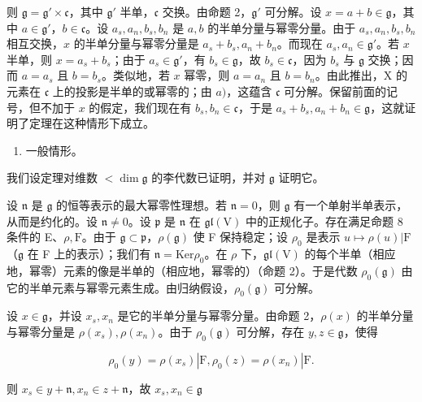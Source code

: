 则 \(\mathfrak{g} = \mathfrak{g}' \times \mathfrak{c}\)，其中 \(\mathfrak{g}'\) 半单，\(\mathfrak{c}\) 交换。由命题 2，\(\mathfrak{g}'\) 可分解。设 \(x = a + b \in \mathfrak{g}\)，其中 \(a \in \mathfrak{g}'\)，\(b \in \mathfrak{c}\)。设 \(a_s, a_n, b_s, b_n\) 是 \(a, b\) 的半单分量与幂零分量。由于 \(a_s, a_n, b_s, b_n\) 相互交换，\(x\) 的半单分量与幂零分量是 \(a_s + b_s, a_n + b_n\)。而现在 \(a_s, a_n \in \mathfrak{g}'\)。若 \(x\) 半单，则 \(x = a_s + b_s\)；由于 \(a_s \in \mathfrak{g}'\)，有 \(b_s \in \mathfrak{g}\)，故 \(b_s \in \mathfrak{c}\)，因为 \(b_s\) 与 \(\mathfrak{g}\) 交换；因而 \(a = a_s\) 且 \(b = b_s\)。类似地，若 \(x\) 幂零，则 \(a = a_n\) 且 \(b = b_n\)。由此推出，X 的元素在 \(\mathfrak{c}\) 上的投影是半单的或幂零的；由 \(a)\)，这蕴含 \(\mathfrak{c}\) 可分解。保留前面的记号，但不加于 \(x\) 的假定，我们现在有 \(b_s, b_n \in \mathfrak{c}\)，于是 \(a_s + b_s, a_n + b_n \in \mathfrak{g}\)，这就证明了定理在这种情形下成立。

\begin{enumerate}
\def\labelenumi{\alph{enumi})}
\setcounter{enumi}{2}
\tightlist
\item
  一般情形。
\end{enumerate}

我们设定理对维数 \(< \dim \mathfrak{g}\) 的李代数已证明，并对 \(\mathfrak{g}\) 证明它。

设 \(\mathfrak{n}\) 是 \(\mathfrak{g}\) 的恒等表示的最大幂零性理想。若 \(\mathfrak{n} = 0\)，则 \(\mathfrak{g}\) 有一个单射半单表示，从而是约化的。设 \(\mathfrak{n} \neq 0\)。设 \(\mathfrak{p}\) 是 \(\mathfrak{n}\) 在 \(\mathfrak{gl}(\mathrm{V})\) 中的正规化子。存在满足命题 8 条件的 E、\(\rho, \mathrm{F}\)。由于 \(\mathfrak{g} \subset \mathfrak{p}\)，\(\rho(\mathfrak{g})\) 使 F 保持稳定；设 \(\rho_0\) 是表示 \(u \mapsto \rho(u)|\mathrm{F}\)（\(\mathfrak{g}\) 在 F 上的表示）；我们有 \(\mathfrak{n} = \mathrm{Ker}\rho_0\)。在 \(\rho\) 下，\(\mathfrak{gl}(\mathrm{V})\) 的每个半单（相应地，幂零）元素的像是半单的（相应地，幂零的）（命题 2）。于是代数 \(\rho_0(\mathfrak{g})\) 由它的半单元素与幂零元素生成。由归纳假设，\(\rho_0(\mathfrak{g})\) 可分解。

设 \(x \in \mathfrak{g}\)，并设 \(x_s, x_n\) 是它的半单分量与幂零分量。由命题 2，\(\rho(x)\) 的半单分量与幂零分量是 \(\rho(x_s), \rho(x_n)\)。由于 \(\rho_0(\mathfrak{g})\) 可分解，存在 \(y, z \in \mathfrak{g}\)，使得

\[
\rho_ {0} (y) = \rho (x _ {s}) | \mathrm{F}, \rho_ {0} (z) = \rho (x _ {n}) | \mathrm{F}.
\]

则 \(x_{s}\in y + \mathfrak{n},x_{n}\in z + \mathfrak{n}\)，故 \(x_{s},x_{n}\in \mathfrak{g}\)

